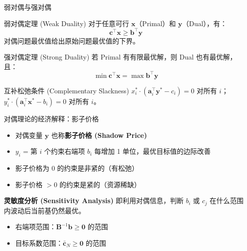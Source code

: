 \documentclass[11pt, aspectratio=169, svgnames, table, fontset=fandol]{ctexbeamer}
\begin{document}
\begin{frame}{弱对偶与强对偶}
  \begin{block}{弱对偶定理 (Weak Duality)}
    对于任意可行 $\bm{x}$（Primal）和 $\bm{y}$（Dual），有：
    \begin{equation*}
      \bm{c}^\top \bm{x} \geq \bm{b}^\top \bm{y}
    \end{equation*}
    对偶问题最优值给出原始问题最优值的下界。
  \end{block}

  \begin{block}{强对偶定理 (Strong Duality)}
    若 Primal 有有限最优解，则 Dual 也有最优解，且：
    \begin{equation*}
      \min \bm{c}^\top \bm{x} = \max \bm{b}^\top \bm{y}
    \end{equation*}
  \end{block}

  \begin{alertblock}{互补松弛条件 (Complementary Slackness)}
    $x_i^* \cdot (\bm{a}_i^\top \bm{y}^* - c_i) = 0$ 对所有 $i$；\\[2pt]
    $y_i^* \cdot (\bm{a}_i^\top \bm{x}^* - b_i) = 0$ 对所有 $i$。
  \end{alertblock}
\end{frame}

\begin{frame}{对偶理论的经济解释：影子价格}
  \begin{itemize}
    \item 对偶变量 $\bm{y}$ 也称\textbf{影子价格 (Shadow Price)}
    \item $y_i$ = 第 $i$ 个约束右端项 $b_i$ 每增加 1 单位，最优目标值的边际改善
    \item 影子价格为 0 的约束是非紧的（有松弛）
    \item 影子价格 $>0$ 的约束是紧的（资源稀缺）
  \end{itemize}

  \vspace{8pt}
  \textbf{灵敏度分析 (Sensitivity Analysis)} 即利用对偶信息，判断 $b_i$ 或 $c_j$ 在什么范围内波动后当前基仍然最优。

  \begin{itemize}
    \item 右端项范围：$\bm{B}^{-1}\bm{b} \geq \bm{0}$ 的范围
    \item 目标系数范围：$\bar{\bm{c}}_N \geq \bm{0}$ 的范围
  \end{itemize}
\end{frame}
\end{document}
